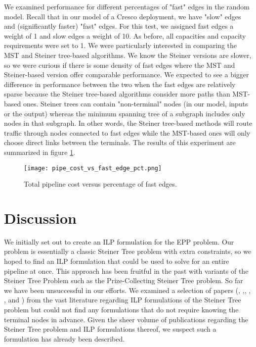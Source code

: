 \documentclass{acmart}
\begin{document}
	We examined performance for different percentages of "fast" edges in the random model. Recall that in our model of a Cresco deployment, we have "slow" edges and (significantly faster) "fast" edges. For this test, we assigned fast edges a weight of 1 and slow edges a weight of 10. As before, all capacities and capacity requirements were set to 1. We were particularly interested in comparing the MST and Steiner tree-based algorithms. We know the Steiner versions are slower, so we were curious if there is some density of fast edges where the MST and Steiner-based version offer comparable performance. We expected to see a bigger difference in performance between the two when the fast edges are relatively sparse because the Steiner tree-based algorithms consider more paths than MST-based ones. Steiner trees can contain "non-terminal" nodes (in our model, inputs or the output) whereas the minimum spanning tree of a subgraph includes only nodes in that subgraph.  In other words, the Steiner tree-based methods will route traffic through nodes connected to fast edges while the MST-based ones will only choose direct links between the terminals. The results of this experiment are summarized in figure \ref{fig:perf_fe}.
	
	\begin{figure}
	    \centering
	    \texttt{[image: pipe\_cost\_vs\_fast\_edge\_pct.png]}
	    \caption{Total pipeline cost versus percentage of fast edges.}
	    \label{fig:perf_fe}
	\end{figure}
	
 	\section{Discussion}
 	We initially set out to create an ILP formulation for the EPP problem. Our problem is essentially a classic Steiner Tree problem with extra constraints, so we hoped to find an ILP formulation that could be used to solve for an entire pipeline at once. This approach has been fruitful in the past with variants of the Steiner Tree Problem such as the Prize-Collecting Steiner Tree problem. So far we have been unsuccessful in our efforts.  We examined a selection of papers (\cite{Aneja1980AnIL}, \cite{Goemans1993ACO},\cite{Koch1998SolvingST}, \cite{Ljubic2005SolvingTP}, \cite{brandstater15}, and \cite{haouari2010strength}) from the vast literature regarding ILP formulations of the Steiner Tree problem but could not find any formulations that do not require knowing the terminal nodes in advance. Given the sheer volume of publications regarding the Steiner Tree problem and ILP formulations thereof, we suspect such a formulation has already been described.
 	
\end{document}
